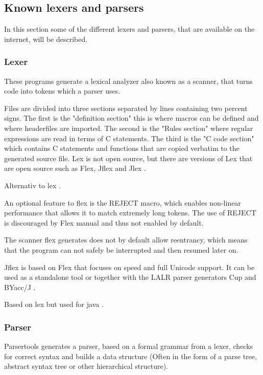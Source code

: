 \subsection{Known lexers and parsers}
\label{sec:KnownLexersAndParsers}

In this section some of the different lexers and parsers, that are available on the internet, will be described.

\subsubsection{Lexer}
These programs generate a lexical analyzer also known as a scanner, that turns code into tokens which a parser uses.

Files are divided into three sections separated by lines containing two percent signs. The first is the "definition section" this is where macros can be defined and where headerfiles are imported. The second is the "Rules section" where regular expressions are read in terms of C statements. The third is the "C code section" which contains C statements and functions that are copied verbatim to the generated source file. Lex is not open source, but there are versions of Lex that are open source such as Flex, Jflex and Jlex \citep{Lex}.

Alternativ to lex \citep{Flex}.

An optional feature to flex is the REJECT macro, which enables non-linear performance that allows it to match extremely long tokens. The use of REJECT is discouraged by Flex manual and thus not enabled by default. 

The scanner flex generates does not by default allow reentrancy, which means that the program can not safely be interrupted and then resumed later on.

Jflex is based on Flex that focuses on speed and full Unicode support. It can be used as a standalone tool or together with the LALR parser generators Cup and BYacc/J \citep{Jflex}.

Based on lex but used for java \citep{Jlex}.

\subsubsection{Parser}
Parsertools generates a parser, based on a formal grammar from a lexer, checks for correct syntax and builds a data structure (Often in the form of a parse tree, abstract syntax tree or other hierarchical structure). 

